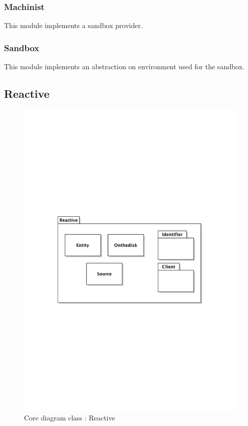 		\subsubsection{Machinist}
			This module implements a sandbox provider.
		\subsubsection{Sandbox}
			This module implements an abstraction on environment used for the sandbox. 
	\subsection{Reactive}
		\begin{figure}[ht]
			\begin{center}
				\includegraphics[width=\textwidth,  trim=2cm 10cm 2cm 10cm]{UML_figure/DC/core/reactive/DC_Reactive.pdf}
				\caption{Core diagram class : Reactive}
			\end{center}
		\end{figure}
